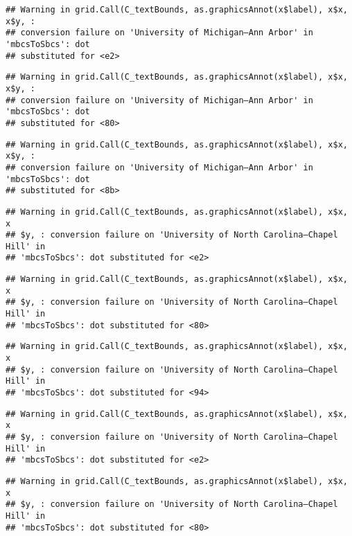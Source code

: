 \documentclass[]{article}
\begin{document}
\begin{verbatim}
## Warning in grid.Call(C_textBounds, as.graphicsAnnot(x$label), x$x, x$y, :
## conversion failure on 'University of Michigan—​Ann Arbor' in 'mbcsToSbcs': dot
## substituted for <e2>
\end{verbatim}

\begin{verbatim}
## Warning in grid.Call(C_textBounds, as.graphicsAnnot(x$label), x$x, x$y, :
## conversion failure on 'University of Michigan—​Ann Arbor' in 'mbcsToSbcs': dot
## substituted for <80>
\end{verbatim}

\begin{verbatim}
## Warning in grid.Call(C_textBounds, as.graphicsAnnot(x$label), x$x, x$y, :
## conversion failure on 'University of Michigan—​Ann Arbor' in 'mbcsToSbcs': dot
## substituted for <8b>
\end{verbatim}

\begin{verbatim}
## Warning in grid.Call(C_textBounds, as.graphicsAnnot(x$label), x$x, x
## $y, : conversion failure on 'University of North Carolina—​Chapel Hill' in
## 'mbcsToSbcs': dot substituted for <e2>
\end{verbatim}

\begin{verbatim}
## Warning in grid.Call(C_textBounds, as.graphicsAnnot(x$label), x$x, x
## $y, : conversion failure on 'University of North Carolina—​Chapel Hill' in
## 'mbcsToSbcs': dot substituted for <80>
\end{verbatim}

\begin{verbatim}
## Warning in grid.Call(C_textBounds, as.graphicsAnnot(x$label), x$x, x
## $y, : conversion failure on 'University of North Carolina—​Chapel Hill' in
## 'mbcsToSbcs': dot substituted for <94>
\end{verbatim}

\begin{verbatim}
## Warning in grid.Call(C_textBounds, as.graphicsAnnot(x$label), x$x, x
## $y, : conversion failure on 'University of North Carolina—​Chapel Hill' in
## 'mbcsToSbcs': dot substituted for <e2>
\end{verbatim}

\begin{verbatim}
## Warning in grid.Call(C_textBounds, as.graphicsAnnot(x$label), x$x, x
## $y, : conversion failure on 'University of North Carolina—​Chapel Hill' in
## 'mbcsToSbcs': dot substituted for <80>
\end{verbatim}
\end{document}
